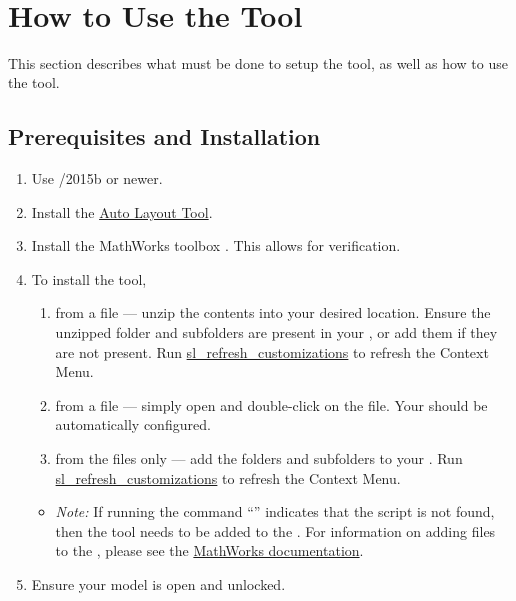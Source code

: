 \documentclass{article}
\begin{document}
\pagebreak~\pagebreak
\section{How to Use the Tool}
This section describes what must be done to setup the tool, as well as how to use the tool.

\subsection{Prerequisites and Installation}

\begin{enumerate}
\item Use \Matlab/\Simulink 2015b or newer.
\item Install the \href{https://www.mathworks.com/matlabcentral/fileexchange/51228-auto-layout-tool}{Auto Layout Tool}.
\item Install the MathWorks toolbox \href{https://www.mathworks.com/products/sldesignverifier.html}{\SDV}. This allows for verification.
\item To install the tool,
	\begin{enumerate}
		\item from a  file --- unzip the contents into your desired location. Ensure the unzipped folder and subfolders are present in your \mpath, or add them if they are not present. Run \href{https://www.mathworks.com/help/simulink/ug/registering-customizations.html}{sl\_refresh\_customizations} to refresh the Context Menu. 
		\item from a  file --- simply open \Matlab and double-click on the file. Your \mpath should be automatically configured.
		\item from the files only --- add the folders and subfolders to your \mpath. Run \href{https://www.mathworks.com/help/simulink/ug/registering-customizations.html}{sl\_refresh\_customizations} to refresh the Context Menu.
	\end{enumerate}
	\begin{itemize}
		\item \textit{Note:} If running the command ``'' indicates that the script is not found, then the tool needs to be added to the \mpath.
		For information on adding files to the \mpath, please see the \href{https://www.mathworks.com/help/matlab/matlab_env/add-remove-or-reorder-folders-on-the-search-path.html}{MathWorks documentation}.
	\end{itemize}
\item Ensure your model is open and unlocked.
\end{enumerate}
\end{document}

